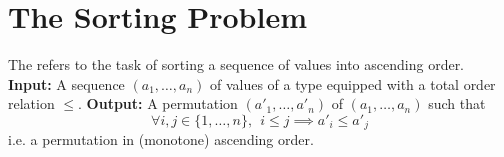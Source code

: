 \documentclass[11pt]{report}
\begin{document}
\section{The Sorting Problem}

\begin{nproblem}
    The  refers to the task of sorting a sequence of values into ascending order.
    \mypar \textbf{Input:} A sequence $(a_1, \dots, a_n)$ of values of a type equipped with a total order relation $\leq$.
    \mypar \textbf{Output:} A permutation $(a'_1, \dots, a'_n)$ of $(a_1, \dots, a_n)$ such that 
    \[\forall i,j \in \{1,\dots,n \}, \ \  i \leq j \implies a'_i \leq a'_j  \]
    i.e. a permutation in (monotone) ascending order.
\end{nproblem}

\printindex
\end{document}
